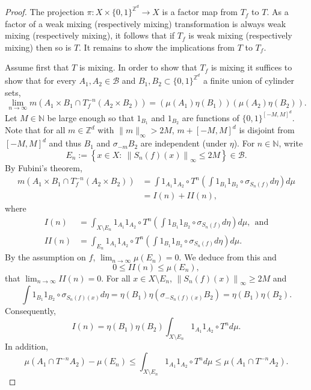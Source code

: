 \documentclass[12pt,reqno]{amsart}
\newcommand{\N}{\mathbb{N}}
\newcommand{\Z}{\mathbb{Z}}
\newcommand{\B}{\mathcal{B}}
\theoremstyle{definition}
\begin{document}
\begin{proof}
The projection $\pi: X\times\{0,1\}^{\Z^d}\to X$ is a factor map from $T_f$ to $T$. As a factor of a weak mixing (respectively mixing) transformation is always weak mixing (respectively mixing), it follows that if $T_f$ is weak mixing (respectively mixing) then so is $T$. It remains to show the implications from $T$ to $T_f$. 

Assume first that $T$ is mixing. In order to show that $T_f$ is mixing it suffices to show that for every $A_1,A_2\in\B$ and $B_1,B_2\subset \{0,1\}^{\Z^d}$ a finite union of cylinder sets,
\[
\lim_{n\to\infty}m\left(A_1\times B_1\cap T_f^{-n}\left(A_2\times B_2\right)\right)=\left(\mu\left(A_1\right)\eta\left(B_1\right)\right)\left(\mu\left(A_2\right)\eta\left(B_2\right)\right). 
\]
Let $M\in\N$ be large enough so that $1_{B_1}$ and $1_{B_2}$ are functions of $\{0,1\}^{[-M,M]^d}$.  Note that for all $m\in\Z^d$ with $\|m\|_\infty>2M$, $m+[-M,M]^d$ is disjoint from $[-M,M]^d$ and thus $B_1$ and $\sigma_{-m}B_2$ are independent (under $\eta$). For $n\in\N$, write 
\[
E_n:=\left\{x\in X:\ \left\|S_n(f)(x)\right\|_\infty\leq 2M\right\}\in\B. 
\]
By Fubini's theorem,
\begin{align*}
m\left(A_1\times B_1\cap T_f^{-n}\left(A_2\times B_2\right)\right)&=\int 1_{A_1}1_{A_2}\circ T^n\left(\int 1_{B_1}1_{B_2}\circ \sigma_{S_n(f)}d\eta\right)d\mu\\
&=I(n)+II(n),
\end{align*}
where 
\begin{align*}
I(n)&= \int_{X\setminus E_n} 1_{A_1}1_{A_2}\circ T^n\left(\int 1_{B_1}1_{B_2}\circ \sigma_{S_n(f)}d\eta\right)d\mu,\ \  \text{and}\\
II(n)&= \int_{E_n} 1_{A_1}1_{A_2}\circ T^n\left(\int 1_{B_1}1_{B_2}\circ \sigma_{S_n(f)}d\eta\right)d\mu.
\end{align*}
By the assumption on $f$, $\lim_{n\to \infty}\mu\left(E_n\right)=0$. We deduce from this and
\[
0\leq II(n)\leq \mu\left(E_n\right),
\]
that $\lim_{n\to\infty}II(n)=0$. For all $x\in X\setminus{E_n}$, $\left\|S_n(f)(x)\right\|_\infty\geq 2M$ and
\[
\int 1_{B_1}1_{B_2}\circ \sigma_{S_n(f)(x)}d\eta=\eta\left(B_1\right)\eta\left(\sigma_{-S_n(f)(x)}B_2\right)=\eta\left(B_1\right)\eta\left(B_2\right). 
\]
Consequently, 
\begin{equation}\label{eq: T mixing to T_f mixing}
I(n)= \eta\left(B_1\right)\eta\left(B_2\right)\int_{X\setminus E_n} 1_{A_1}1_{A_2}\circ T^n d\mu. 
\end{equation}
In addition, 
\[
\mu\left(A_1\cap T^{-n}A_2\right)-\mu\left(E_n\right)\leq \int_{X\setminus E_n} 1_{A_1}1_{A_2}\circ T^n d\mu\leq \mu\left(A_1\cap T^{-n}A_2\right). 
\]
\end{proof}
\end{document}
